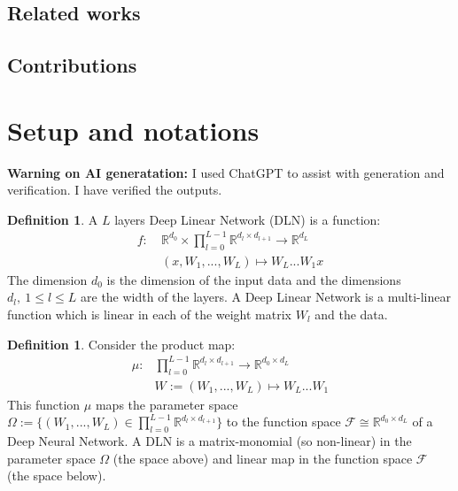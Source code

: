 \documentclass{article}
\theoremstyle{definition}
\newtheorem{definition}[theorem]{Definition}
\begin{document}
\subsection{Related works}


\subsection{Contributions}


\section{Setup and notations}
\textbf{Warning on AI generatation:} I used ChatGPT to assist with generation and verification. I have verified the outputs. 
\begin{definition}
    A $L$ layers Deep Linear Network (DLN) is a function:
\begin{align*}
    f: \ & \mathbb{R}^{d_0} \times \prod_{l=0}^{L-1}\mathbb{R}^{d_l \times d_{l+1}}  \to \mathbb{R}^{d_L} \\
       & (x,W_1,...,W_L) \mapsto W_L...W_1 x
\end{align*}
The dimension $d_0$ is the dimension of the input data and the dimensions $d_l,\ 1\leq l \leq L$ are the width of the layers. A Deep Linear Network is a multi-linear function which is linear in each of the weight matrix $W_l$ and the data.
\end{definition}
\begin{definition}
    Consider the product map:
\begin{align*}
    \mu : & \prod_{l=0}^{L-1}\mathbb{R}^{d_l \times d_{l+1}} \to \mathbb{R}^{d_0\times d_L}\\
           &  W:=(W_1,...,W_L) \mapsto W_L...W_1
\end{align*}
This function $\mu$ maps the parameter space $\Omega:=\{(W_1,...,W_L) \in \prod_{l=0}^{L-1}\mathbb{R}^{d_l \times d_{l+1}}\}$ to the function space $\mathcal{F} \cong \mathbb{R}^{d_0\times d_L}$ of a Deep Neural Network. A DLN is a matrix-monomial (so non-linear) in the parameter space $\Omega$ (the space above) and linear map in the function space $\mathcal{F}$ (the space below).
\end{definition}
\end{document}
